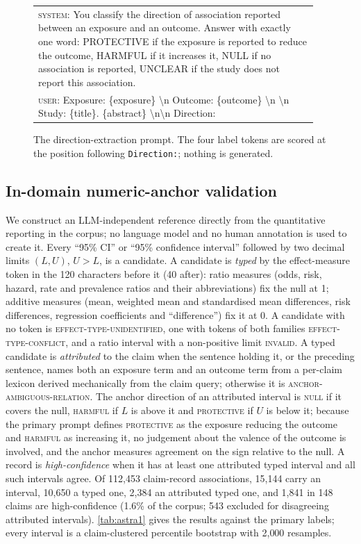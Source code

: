 \documentclass[11pt]{article}
\begin{document}
\begin{figure}[!t]
\small
\begin{tabular}{@{}p{0.95\linewidth}@{}}
\toprule
\textsc{system}: You classify the direction of association reported between an exposure and an
outcome. Answer with exactly one word: PROTECTIVE if the exposure is reported to reduce the outcome,
HARMFUL if it increases it, NULL if no association is reported, UNCLEAR if the study does not report
this association. \\[4pt]
\textsc{user}: Exposure: \{exposure\} \textbackslash n Outcome: \{outcome\} \textbackslash n
\textbackslash n Study: \{title\}. \{abstract\} \textbackslash n\textbackslash n Direction: \\
\bottomrule
\end{tabular}
\caption{The direction-extraction prompt. The four label tokens are scored at the position
following \texttt{Direction:}; nothing is generated.}
\label{fig:prompt}
\end{figure}

\subsection{In-domain numeric-anchor validation}
\label{app:anchor}
We construct an LLM-independent reference directly from the quantitative reporting in the corpus;
no language model and no human annotation is used to create it. Every ``95\% CI'' or ``95\%
confidence interval'' followed by two decimal limits $(L,U)$, $U>L$, is a candidate. A candidate is
\emph{typed} by the effect-measure token in the 120 characters before it (40 after): ratio measures
(odds, risk, hazard, rate and prevalence ratios and their abbreviations) fix the null at 1; additive
measures (mean, weighted mean and standardised mean differences, risk differences, regression
coefficients and ``difference'') fix it at 0. A candidate with no token is
\textsc{effect-type-unidentified}, one with tokens of both families \textsc{effect-type-conflict},
and a ratio interval with a non-positive limit \textsc{invalid}. A typed candidate is
\emph{attributed} to the claim when the sentence holding it, or the preceding sentence, names both
an exposure term and an outcome term from a per-claim lexicon derived mechanically from the claim
query; otherwise it is \textsc{anchor-ambiguous-relation}. The anchor direction of an attributed
interval is \textsc{null} if it covers the null, \textsc{harmful} if $L$ is above it and
\textsc{protective} if $U$ is below it; because the primary prompt defines \textsc{protective} as
the exposure reducing the outcome and \textsc{harmful} as increasing it, no judgement about the
valence of the outcome is involved, and the anchor measures agreement on the sign relative to the
null. A record is \emph{high-confidence} when it has at least one attributed typed interval and all
such intervals agree. Of 112{,}453 claim-record associations, 15{,}144 carry an interval, 10{,}650 a typed one,
2{,}384 an attributed typed one, and 1{,}841 in 148 claims are high-confidence (1.6\% of the
corpus; 543 excluded for disagreeing attributed intervals). \cref{tab:astra1} gives the
results against the primary labels; every interval is a claim-clustered percentile bootstrap with 2{,}000 resamples.
\end{document}
